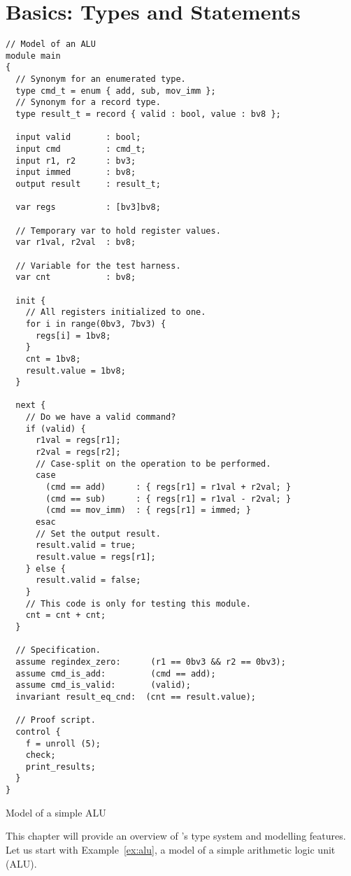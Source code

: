 \chapter{Basics: Types and Statements}

\begin{uclidlisting}
\begin{lstlisting}[language=uclid,style=uclidstyle]
// Model of an ALU
module main
{
  // Synonym for an enumerated type.
  type cmd_t = enum { add, sub, mov_imm };
  // Synonym for a record type.
  type result_t = record { valid : bool, value : bv8 };

  input valid       : bool;
  input cmd         : cmd_t;
  input r1, r2      : bv3;
  input immed       : bv8;
  output result     : result_t;

  var regs          : [bv3]bv8;

  // Temporary var to hold register values.
  var r1val, r2val  : bv8;

  // Variable for the test harness.
  var cnt           : bv8; 

  init {
    // All registers initialized to one.
    for i in range(0bv3, 7bv3) {
      regs[i] = 1bv8;
    }
    cnt = 1bv8;
    result.value = 1bv8;
  }

  next {
    // Do we have a valid command?
    if (valid) {
      r1val = regs[r1];
      r2val = regs[r2];
      // Case-split on the operation to be performed.
      case
        (cmd == add)      : { regs[r1] = r1val + r2val; }
        (cmd == sub)      : { regs[r1] = r1val - r2val; }
        (cmd == mov_imm)  : { regs[r1] = immed; }
      esac
      // Set the output result.
      result.valid = true;
      result.value = regs[r1];
    } else {
      result.valid = false;
    }
    // This code is only for testing this module.
    cnt = cnt + cnt;
  }

  // Specification.
  assume regindex_zero:      (r1 == 0bv3 && r2 == 0bv3);
  assume cmd_is_add:         (cmd == add);
  assume cmd_is_valid:       (valid);
  invariant result_eq_cnd:  (cnt == result.value);

  // Proof script.
  control {
    f = unroll (5);
    check;
    print_results;
  }
}
\end{lstlisting}
\caption{Model of a simple ALU}
\label{ex:alu}
\end{uclidlisting}

This chapter will provide an overview of \uclid{}'s type system and modelling features. Let us start with Example~\ref{ex:alu}, a model of a simple arithmetic logic unit (ALU). 

